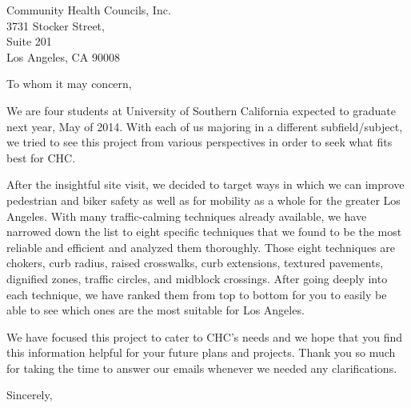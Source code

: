 \documentclass{letter}
\date{6\textsuperscript{th} December 2013}
\begin{document}
\begin{letter}{Community Health Councils, Inc.\\3731 Stocker Street,\\ Suite 201\\ Los Angeles, CA 90008}
\opening{To whom it may concern,}

We are four students at University of Southern California expected to graduate next year, May of 2014. With each of us majoring in a different subfield/subject, we tried to see this project from various perspectives in order to seek what fits best for CHC. 

After the insightful site visit, we decided to target ways in which we can improve pedestrian and biker safety as well as for mobility as a whole for the greater Los Angeles. With many traffic-calming techniques already available, we have narrowed down the list to eight specific techniques that we found to be the most reliable and efficient and analyzed them thoroughly. Those eight techniques are chokers, curb radius, raised crosswalks, curb extensions, textured pavements, dignified zones, traffic circles, and midblock crossings. After going deeply into each technique, we have ranked them from top to bottom for you to easily be able to see which ones are the most suitable for Los Angeles. 

We have focused this project to cater to CHC’s needs and we hope that you find this information helpful for your future plans and projects. Thank you so much for taking the time to answer our emails whenever we needed any clarifications. 

\closing{Sincerely,}
\end{letter}
\end{document}
